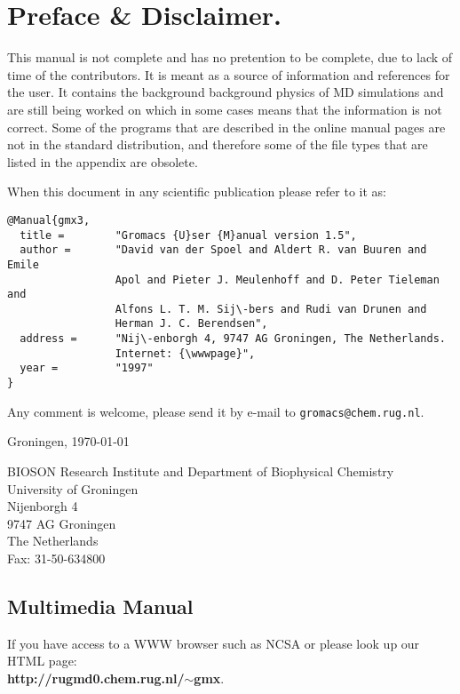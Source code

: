 \documentclass[11pt,dvips]{book}
\newcommand{\wwwpage}{\bf http://rugmd0.chem.rug.nl/$\sim$gmx}
\begin{document}
\newpage
\section*{Preface \& Disclaimer.}
This manual is not complete and has no pretention to be complete, 
due to lack of time of the contributors.
It is meant as a source of information and references for the {\gromacs} user.
It contains the background background physics of MD simulations and
are still being worked on which in some cases means that the information is
not correct. Some of the programs that are described in the online manual
pages are not in the standard distribution, and therefore some of the
file types that are listed in the appendix are obsolete.

When  this document in any scientific publication
please refer to it as:	\\
\begin{verbatim}
@Manual{gmx3,
  title =        "Gromacs {U}ser {M}anual version 1.5",
  author =       "David van der Spoel and Aldert R. van Buuren and Emile
                 Apol and Pieter J. Meulenhoff and D. Peter Tieleman and
                 Alfons L. T. M. Sij\-bers and Rudi van Drunen and
                 Herman J. C. Berendsen",
  address =      "Nij\-enborgh 4, 9747 AG Groningen, The Netherlands.
                 Internet: {\wwwpage}",
  year =         "1997"
}
\end{verbatim}

Any comment is welcome, please send it by e-mail to
{\tt gromacs@chem.rug.nl}. 
\medskip

Groningen, \today
\medskip

{\sf BIOSON} Research Institute and Department of Biophysical Chemistry	\\
University of Groningen \\ 
Nijenborgh 4				\\
9747 AG Groningen			\\
The Netherlands				\\
Fax: 31-50-634800

\newpage
\subsection*{Multimedia Manual}
If you  have access to a WWW browser such as NCSA 
or 
please look up
our HTML page: \\
{\wwwpage}.
\end{document}
